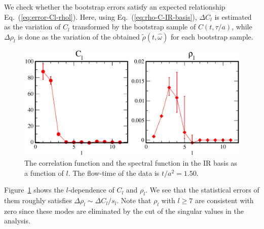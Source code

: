\documentclass[a4paper,11pt]{article}
\begin{document}
We check whether the bootstrap errors satisfy an expected relationship Eq.~(\ref{eq:error-Cl-rhol}).
Here, using Eq.~(\ref{eq:rho-C-IR-basis}), $\Delta C_l$ is estimated as the variation of $C_l$  transformed by the bootstrap sample of $C(t,\tau/a)$,
while $\Delta \rho_l$ is done as the variation of the obtained $\tilde{\rho}(t,\hat{\omega})$ for each bootstrap sample.
\begin{figure}[h]
\begin{center}
\includegraphics[scale=0.5]{./Cl-rhol-with-error.pdf}
\caption{The correlation function and the spectral function in the IR basis as a function of $l$.  The flow-time of the data is $t/a^2=1.50$. }
\label{fig:Cl-rhol}
\end{center}
\end{figure}
Figure~\ref{fig:Cl-rhol} shows the $l$-dependence of $C_l$ and $\rho_l$.
We see that the statistical errors of them roughly satisfies $\Delta \rho_l \sim \Delta C_l /s_l $.
Note that $\rho_l$ with $l \ge 7$ are consistent with zero since these modes are eliminated by the cut of the singular values in the analysis.
\end{document}
